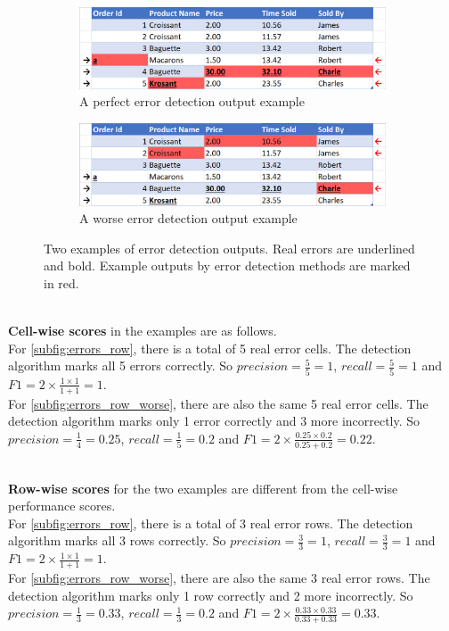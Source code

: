 \begin{figure}[h]
\centering
    \begin{subfigure}{0.9\textwidth}
        \includegraphics[width=\linewidth]{thesis/Figures/Method/Errors_dataset_F1_row.png}
        \caption{A perfect error detection output example}
        \label{subfig:errors_row}
    \end{subfigure}
    \begin{subfigure}{0.9\textwidth}
        \includegraphics[width=\linewidth]{thesis/Figures/Method/Errors_dataset_Worse_F1_row.png}
        \caption{A worse error detection output example}
        \label{subfig:errors_row_worse}
    \end{subfigure}
    \caption{Two examples of error detection outputs. Real errors are underlined and bold. Example outputs by error detection methods are marked in red.}
    \label{fig:error_row_wise}
\end{figure}

~\\\textbf{Cell-wise scores} in the examples are as follows. 
\\For \autoref{subfig:errors_row}, there is a total of 5 real error cells. The detection algorithm marks all 5 errors correctly. So $precision = \frac{5}{5} = 1$, $recall = \frac{5}{5} = 1$ and $F1 = 2 \times \frac{1 \times 1}{1 + 1} = 1$. 
\\For \autoref{subfig:errors_row_worse}, there are also the same 5 real error cells. The detection algorithm marks only 1 error correctly and 3 more incorrectly. So $precision = \frac{1}{4} = 0.25$, $recall = \frac{1}{5} = 0.2$ and $F1 = 2 \times \frac{0.25 \times 0.2}{0.25 + 0.2} = 0.22$. 

~\\\textbf{Row-wise scores} for the two examples are different from the cell-wise performance scores.
\\For \autoref{subfig:errors_row}, there is a total of 3 real error rows. The detection algorithm marks all 3 rows correctly. So $precision = \frac{3}{3} = 1$, $recall = \frac{3}{3} = 1$ and $F1 = 2 \times \frac{1 \times 1}{1 + 1} = 1$. 
\\For \autoref{subfig:errors_row_worse}, there are also the same 3 real error rows. The detection algorithm marks only 1 row correctly and 2 more incorrectly. So $precision = \frac{1}{3} = 0.33$, $recall = \frac{1}{3} = 0.2$ and $F1 = 2 \times \frac{0.33 \times 0.33}{0.33 + 0.33} = 0.33$. 


